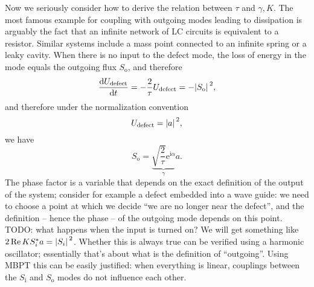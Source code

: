 \documentclass[hyperref, a4paper]{article}
\newcommand*{\ii}{\mathrm{i}}
\newcommand*{\ee}{\mathrm{e}}
\newcommand*{\Si}{S_{\text{i}}}
\newcommand*{\So}{S_{\text{o}}}
\begin{document}
Now we seriously consider how to derive the relation between $\tau$ and $\gamma, K$.
The most famous example for coupling with outgoing modes leading to dissipation 
is arguably the fact that an infinite network of LC circuits is equivalent to a resistor.
Similar systems include a mass point connected to an infinite spring or a leaky cavity.
When there is no input to the defect mode, 
the loss of energy in the mode equals the outgoing flux $\So$, and therefore 
\begin{equation}
    \dv{U_{\text{defect}}}{t} = - \frac{2}{\tau} U_{\text{defect}}
    = - \abs*{\So}^2,
\end{equation}
and therefore under the normalization convention 
\begin{equation}
    U_{\text{defect}} = \abs*{a}^2,
\end{equation}
we have
\begin{equation}
    \So = \underbrace{\sqrt{\frac{2}{\tau}} \ee^{\ii \alpha}}_\gamma a.
\end{equation}
The phase factor is a variable that depends on the exact definition of the output of the system;
consider for example a defect embedded into a wave guide: 
we need to choose a point at which we decide ``we are no longer near the defect'', 
and the definition -- hence the phase -- of the outgoing mode depends on this point.
TODO: what happens when the input is turned on? 
We will get something like $2\Re K S_i^* a = \abs*{S_i}^2$.
Whether this is always true can be verified using a harmonic oscillator; 
essentially that's about what is the definition of ``outgoing''. 
Using MBPT this can be easily justified:
when everything is linear, couplings between the $\Si$ and $\So$ modes do not influence each other.
\end{document}
